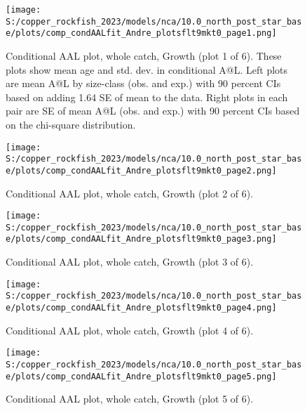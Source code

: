 \documentclass[11pt,
  letterpaper,
]{article}
\begin{document}
\begin{figure}
{\centering
\texttt{[image: S:/copper\_rockfish\_2023/models/nca/10.0\_north\_post\_star\_base/plots/comp\_condAALfit\_Andre\_plotsflt9mkt0\_page1.png]}
}
\caption{Conditional AAL plot, whole catch, Growth (plot 1 of 6). These plots show mean age and std. dev. in conditional A@L. Left plots are mean A@L by size-class (obs. and exp.) with 90 percent CIs based on adding 1.64 SE of mean to the data. Right plots in each pair are SE of mean A@L (obs. and exp.) with 90 percent CIs based on the chi-square distribution.\label{fig:comp-condAALfit-Andre-plotsflt9mkt0-page1}}
\end{figure}

\begin{figure}
{\centering
\texttt{[image: S:/copper\_rockfish\_2023/models/nca/10.0\_north\_post\_star\_base/plots/comp\_condAALfit\_Andre\_plotsflt9mkt0\_page2.png]}
}
\caption{Conditional AAL plot, whole catch, Growth (plot 2 of 6).\label{fig:comp-condAALfit-Andre-plotsflt9mkt0-page2}}
\end{figure}

\begin{figure}
{\centering
\texttt{[image: S:/copper\_rockfish\_2023/models/nca/10.0\_north\_post\_star\_base/plots/comp\_condAALfit\_Andre\_plotsflt9mkt0\_page3.png]}
}
\caption{Conditional AAL plot, whole catch, Growth (plot 3 of 6).\label{fig:comp-condAALfit-Andre-plotsflt9mkt0-page3}}
\end{figure}

\begin{figure}
{\centering
\texttt{[image: S:/copper\_rockfish\_2023/models/nca/10.0\_north\_post\_star\_base/plots/comp\_condAALfit\_Andre\_plotsflt9mkt0\_page4.png]}
}
\caption{Conditional AAL plot, whole catch, Growth (plot 4 of 6).\label{fig:comp-condAALfit-Andre-plotsflt9mkt0-page4}}
\end{figure}

\begin{figure}
{\centering
\texttt{[image: S:/copper\_rockfish\_2023/models/nca/10.0\_north\_post\_star\_base/plots/comp\_condAALfit\_Andre\_plotsflt9mkt0\_page5.png]}
}
\caption{Conditional AAL plot, whole catch, Growth (plot 5 of 6).\label{fig:comp-condAALfit-Andre-plotsflt9mkt0-page5}}
\end{figure}
\end{document}
